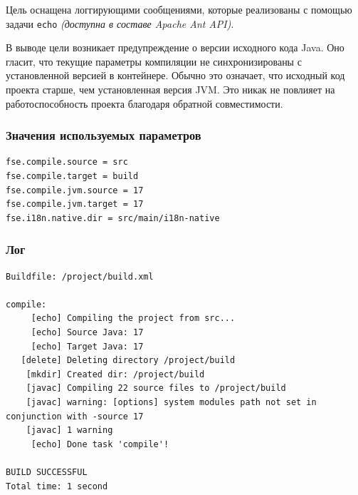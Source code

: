 Цель оснащена логгирующими сообщениями, которые реализованы с помощью задачи \texttt{echo} \textit{(доступна в составе Apache Ant API)}.

В выводе цели возникает предупреждение о версии исходного кода Java. Оно гласит, что текущие параметры компиляции не синхронизированы с установленной версией в контейнере. Обычно это означает, что исходный код проекта старше, чем установленная версия JVM. Это никак не повлияет на работоспособность проекта благодаря обратной совместимости.  

\subsubsection{Значения используемых параметров}

\begin{lstlisting}[language=Properties,caption={Часть содержимого файла \texttt{build.properties}},captionpos=b]
fse.compile.source = src
fse.compile.target = build
fse.compile.jvm.source = 17
fse.compile.jvm.target = 17
fse.i18n.native.dir = src/main/i18n-native
\end{lstlisting}

\subsubsection{Лог}

\begin{lstlisting}[caption={Лог цели \texttt{compile}},language={},captionpos=b]
Buildfile: /project/build.xml

compile:
     [echo] Compiling the project from src...
     [echo] Source Java: 17
     [echo] Target Java: 17
   [delete] Deleting directory /project/build
    [mkdir] Created dir: /project/build
    [javac] Compiling 22 source files to /project/build
    [javac] warning: [options] system modules path not set in conjunction with -source 17
    [javac] 1 warning
     [echo] Done task 'compile'!

BUILD SUCCESSFUL
Total time: 1 second
\end{lstlisting}